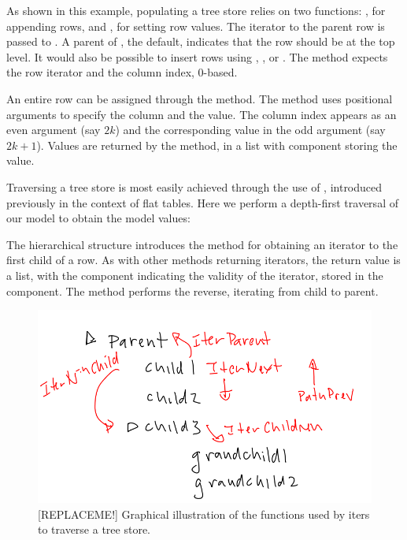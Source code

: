 As shown in this example, populating a tree store relies on two
functions: , for appending rows, and
, for setting row values. The iterator
to the parent row is passed to . A parent
of , the default, indicates that the row should be at the
top level. It would also be possible to insert rows using
, , or
. The
 method expects the row iterator and
the column index, $0$-based.

An entire row can be assigned through the 
method. The method uses positional arguments to specify the column and
the value. The column index appears as an even argument (say $2k$) and
the corresponding value in the odd argument (say $2k+1$).  Values are
returned by the  method, in a list with
component  storing the value.

Traversing a tree store is most easily achieved through the use of
, introduced previously in the context of flat
tables. Here we perform a depth-first traversal of our 
model to obtain the model values: 

\begin{Schunk}
\end{Schunk}
%
The hierarchical structure introduces the method
 for obtaining an iterator to the
first child of a row. As with other methods returning iterators, the
return value is a list, with the  component indicating
the validity of the iterator, stored in the  component. The
method  performs the reverse,
iterating from child to parent.

\begin{figure}
  \includegraphics[width=.7\textwidth]{traverse-tree}
  \caption{[REPLACEME!] Graphical illustration of the functions used
    by iters to traverse a tree store. }
  \label{fig:traverse-iter}
\end{figure}


